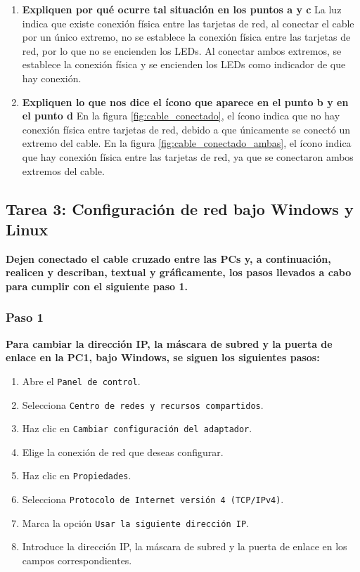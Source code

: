 \begin{enumerate}
            \item \textbf{Expliquen por qué ocurre tal situación en los puntos a y c}
            La luz indica que existe conexión física entre las tarjetas de red, al conectar el cable por un único extremo, no se establece la conexión física entre las tarjetas de red, por lo que no se encienden los LEDs. Al conectar ambos extremos, se establece la conexión física y se encienden los LEDs como indicador de que hay conexión.
            \item \textbf{Expliquen lo que nos dice el ícono que aparece en el punto b y en el punto d}
            En la figura \ref{fig:cable_conectado}, el ícono indica que no hay conexión física entre tarjetas de red, debido a que únicamente se conectó un extremo del cable. En la figura \ref{fig:cable_conectado_ambas}, el ícono indica que hay conexión física entre las tarjetas de red, ya que se conectaron ambos extremos del cable.
        \end{enumerate}

    \subsection{Tarea 3: Configuración de red bajo Windows y Linux}
    \textbf{Dejen conectado el cable cruzado entre las PCs y, a continuación, realicen y describan, textual y gráficamente, los pasos llevados a cabo para cumplir con el siguiente paso 1.}
        \subsubsection*{Paso 1}

        \textbf{Para cambiar la dirección IP, la máscara de subred y la puerta de enlace en la PC1, bajo Windows, se siguen los siguientes pasos:}

        \begin{enumerate} 
            \item Abre el \texttt{Panel de control}. 
            \item Selecciona \texttt{Centro de redes y recursos compartidos}. 
            \item Haz clic en \texttt{Cambiar configuración del adaptador}. 
            \item Elige la conexión de red que deseas configurar. 
            \item Haz clic en \texttt{Propiedades}. 
            \item Selecciona \texttt{Protocolo de Internet versión 4 (TCP/IPv4)}. 
            \item Marca la opción \texttt{Usar la siguiente dirección IP}. 
            \item Introduce la dirección IP, la máscara de subred y la puerta de enlace en los campos correspondientes. 
        \end{enumerate}

